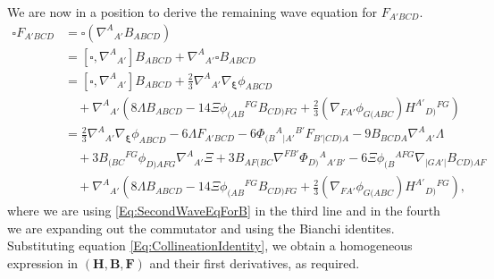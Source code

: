 \documentclass[10pt,a4paper]{article}
\theoremstyle{plain}
\def\bmB{{\bm B}}
\def\bmF{{\bm F}}
\def\bmH{{\bm H}}
\begin{document}
We are now in a position to derive the remaining wave equation for
$F_{A'BCD}$.
\begin{align*}
    \square F_{A'BCD} &= \square (\nabla^A{}_{A'}B_{ABCD}) \\
    &= \left[\square, \nabla^A{}_{A'}\right] B_{ABCD} + \nabla^A{}_{A'}\square B_{ABCD} \\
    &= \left[\square, \nabla^A{}_{A'}\right] B_{ABCD} + \tfrac{2}{3}\nabla^A{}_{A'}\nabla_{\bm\xi}\phi_{ABCD} \\
    &\quad+ \nabla^A{}_{A'}\left(8\Lambda B_{ABCD} - 14\Xi \phi_{(AB}{}^{FG}B_{CD)FG} + \tfrac{2}{3}(\nabla_{FA'}\phi_{G(ABC})H^{A'}{}_{D)}{}^{FG}\right)\\
    &=   \tfrac{2}{3}\nabla^A{}_{A'}\nabla_{\bm\xi}\phi_{ABCD} -6 \Lambda F_{A'BCD} - 6 \Phi_{(B}{}^{A}{}_{\vert A'}{}^{B'} F_{B'\vert CD)A} - 9 B_{BCDA} \nabla^{A}{}_{A'}\Lambda \\
    &\quad + 3B_{(BC}{}^{FG} \phi_{D)AFG} \nabla^{A}{}_{A'}\Xi  + 3B_{AF(BC} \nabla^{FB'}\Phi_{D)}{}^{A}{}_{A'B'}  - 6 \Xi \phi_{(B}{}^{AFG} \nabla_{\vert GA'\vert}B_{CD)AF} \\
    &\quad + \nabla^A{}_{A'}\left(8\Lambda B_{ABCD} - 14\Xi \phi_{(AB}{}^{FG}B_{CD)FG} + \tfrac{2}{3}(\nabla_{FA'}\phi_{G(ABC})H^{A'}{}_{D)}{}^{FG}\right),
\end{align*}
where we are using \eqref{Eq:SecondWaveEqForB} in the third line and
in the fourth we are expanding out the commutator and using the
Bianchi identites. Substituting equation \eqref{Eq:CollineationIdentity}, we
obtain a homogeneous expression in $(\bmH, \bmB,\bmF)$ and their first
derivatives, as required.
\\
\end{document}
